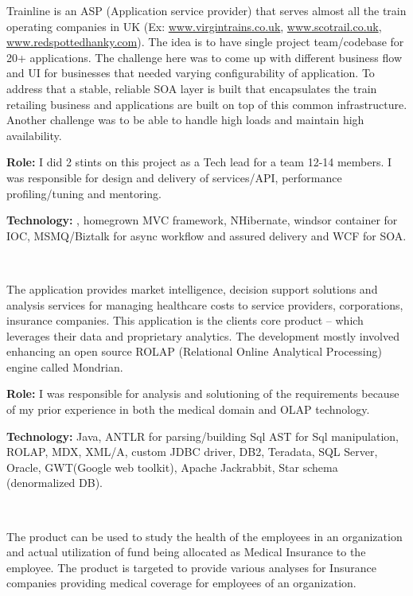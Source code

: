 \begin{resume}
\begin{position}
Trainline is an ASP (Application service provider) that serves almost all the train operating companies in UK (Ex: \url{www.virgintrains.co.uk}, \url{www.scotrail.co.uk}, \url{www.redspottedhanky.com}). The idea is to have single project team/codebase for 20+ applications. The challenge here was to come up with different business flow and UI for businesses that needed varying configurability of application. To address that a stable, reliable SOA layer is built that encapsulates the train retailing business and applications are built on top of this common infrastructure. Another challenge was to be able to handle high loads and maintain high availability.

{\textbf{Role:}} I did 2 stints on this project as a Tech lead for a team 12-14 members. I was responsible for design and delivery of services/API, performance profiling/tuning and mentoring.

{\textbf{Technology:}} \CSharp, homegrown MVC framework, NHibernate,  windsor container for IOC, MSMQ/Biztalk for async workflow and assured delivery and WCF for SOA.
\end{position}\\


\begin{position}
The application provides market intelligence, decision support solutions and analysis services for managing healthcare costs to service providers, corporations, insurance companies. This application is the clients core product – which leverages their data and proprietary analytics. The 
development mostly involved enhancing an open source ROLAP (Relational Online Analytical Processing) engine called Mondrian. 

{\textbf{Role:}} I was responsible for analysis and solutioning of the requirements because of my prior experience in both the medical domain and OLAP technology. 

{\textbf{Technology:}} Java, ANTLR for parsing/building Sql AST for Sql manipulation, ROLAP, MDX, XML/A, custom JDBC driver, DB2, Teradata, SQL Server, Oracle, GWT(Google web toolkit), Apache Jackrabbit, Star schema (denormalized DB).
\end{position}\\

\begin{position}
The product can be used to study the health of the employees in an organization and actual utilization of fund being allocated as Medical Insurance to the employee. The product is targeted to provide various analyses for Insurance companies providing medical coverage for employees of an organization.


\end{position}
\end{resume}
